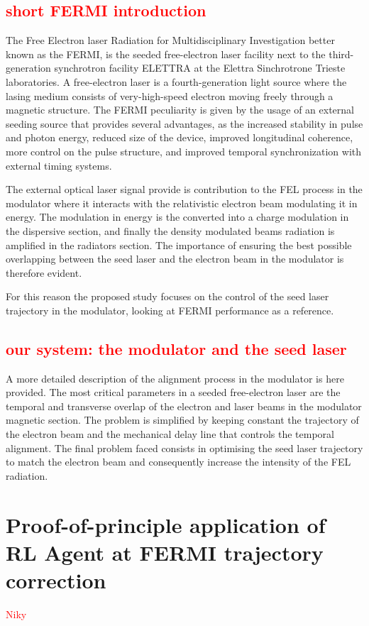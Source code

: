 \documentclass[
 reprint,
 amsmath,amssymb,amsfonts,clevref,
 aps,
prstab,
]{revtex4-2}
\newcommand{\NB}[1]{\textcolor{red}{#1}}
\begin{document}
\subsection{\NB{short FERMI introduction}}
The Free Electron laser Radiation for Multidisciplinary Investigation  better known as the FERMI, is the seeded free-electron laser facility next to the third-generation synchrotron facility ELETTRA at the Elettra Sinchrotrone Trieste laboratories.
A free-electron laser is a fourth-generation light source where the lasing medium consists of very-high-speed electron moving freely through a magnetic structure. The FERMI peculiarity is given by the usage of an external seeding source that provides several advantages, as the increased stability in pulse and photon energy, reduced size of the device, improved longitudinal coherence, more control on the pulse structure, and improved temporal synchronization with external timing systems.

The external optical laser signal provide is contribution to the FEL process in the modulator where it interacts with the relativistic electron beam modulating it in energy. The modulation in energy is the converted into a charge modulation in the dispersive section, and finally the density modulated beams radiation is amplified in the radiators section. The importance of ensuring the best possible overlapping between the seed laser and the electron beam in the modulator is therefore evident.

For this reason the proposed study focuses on the control of the seed laser trajectory in the modulator, looking at FERMI performance as a reference.

\subsection{\NB{our system: the modulator and the seed laser}}
A more detailed description of the alignment process in the modulator is here provided.
The most critical parameters in a seeded free-electron laser are the temporal and transverse overlap of the electron and laser beams in the modulator magnetic section. 
The problem is simplified by keeping constant the trajectory of the electron beam and the mechanical delay line that controls the temporal alignment.
The final problem faced consists in optimising the seed laser trajectory to match the electron beam and consequently increase the intensity of the FEL radiation.



\section{Proof-of-principle application of RL Agent at FERMI trajectory correction}
\NB{Niky}
\end{document}
